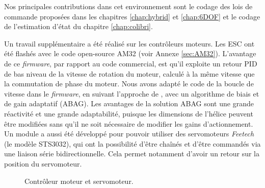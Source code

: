 Nos principales contributions dans cet environnement sont le codage des lois de commande proposées dans les chapitres \ref{chap:hybrid} et \ref{chap:6DOF} et le codage de l'estimation d'état du chapitre \ref{chap:colibri}. 

Un travail supplémentaire a été réalisé sur les contrôleurs moteurs. Les ESC ont été flashés avec le code open-source AM32 (voir Annexe \ref{sec:AM32}). L'avantage de ce \textit{firmware}, par rapport au code commercial, est qu'il exploite un retour PID  de bas niveau de la vitesse de rotation du moteur, calculé à la même vitesse que la commutation de phase du moteur. Nous avons adapté le code de la boucle de vitesse dans le \textit{firmware}, en suivant l'approche de \cite{franchi2017}, avec un algorithme de biais et de gain adaptatif (ABAG). Les avantages de la solution ABAG sont une grande réactivité et une grande adaptabilité, puisque les dimensions de l'hélice peuvent être modifiées sans qu'il ne soit nécessaire de modifier les gains d'actionnement.
Un module a aussi été développé pour pouvoir utiliser des servomoteurs \textit{Feetech} (le modèle STS3032), qui ont la possibilité d'être chaînés et d'être commandés via une liaison série bidirectionnelle. Cela permet notamment d'avoir un retour sur la position du servomoteur.

\begin{figure}[ht!]
    \centering
    \caption{Contrôleur moteur et servomoteur.}
    \label{fig:ESCServo}
\end{figure}




